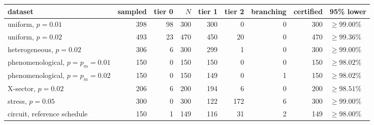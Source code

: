 \begin{tabular}{@{}lrrrrrrrl@{}}
\toprule
dataset & sampled & tier 0 & $N$ & tier 1 & tier 2 & branching & certified & 95\% lower \\
\midrule
uniform, $p=0.01$ & 398 & 98 & 300 & 300 & 0 & 0 & 300 & $\ge 99.00\%$ \\
uniform, $p=0.02$ & 493 & 23 & 470 & 450 & 20 & 0 & 470 & $\ge 99.36\%$ \\
heterogeneous, $p=0.02$ & 306 & 6 & 300 & 299 & 1 & 0 & 300 & $\ge 99.00\%$ \\
phenomenological, $p=p_m=0.01$ & 150 & 0 & 150 & 150 & 0 & 0 & 150 & $\ge 98.02\%$ \\
phenomenological, $p=p_m=0.02$ & 150 & 0 & 150 & 149 & 0 & 1 & 150 & $\ge 98.02\%$ \\
X-sector, $p=0.02$ & 206 & 6 & 200 & 194 & 6 & 0 & 200 & $\ge 98.51\%$ \\
stress, $p=0.05$ & 300 & 0 & 300 & 122 & 172 & 6 & 300 & $\ge 99.00\%$ \\
circuit, reference schedule & 150 & 1 & 149 & 116 & 31 & 2 & 149 & $\ge 98.00\%$ \\
\bottomrule
\end{tabular}
